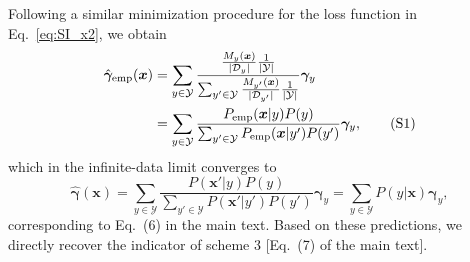 \documentclass[twocolumn,aps,pra,superscriptaddress,tightlines,nofootinbib]{revtex4-2}
\newcommand\numberthis{\addtocounter{equation}{1}\tag{\theequation}}
\begin{document}
	\indent Following a similar minimization procedure for the loss function in Eq.~\eqref{eq:SI_x2}, we obtain
	\begin{align*}
		\hat{\bm{\gamma}}_{\rm emp}(\bm{x}) &= \sum_{y \in \mathcal{Y}} \frac{ \frac{M_{y}(\bm{x})}{|\mathcal{D}_{y}|} \frac{1}{|\mathcal{Y}|}}{\sum_{y' \in \mathcal{Y}} \frac{M_{y'}(\bm{x})}{|\mathcal{D}_{y'}|} \frac{1}{|\mathcal{Y}|}} \bm{\gamma}_{y}\\
		&= \sum_{y \in \mathcal{Y}} \frac{ P_{\rm emp}(\bm{x}|y) P(y)}{\sum_{y' \in \mathcal{Y}} P_{\rm emp}(\bm{x}|y') P(y')} \bm{\gamma}_{y},\numberthis
	\end{align*}
	which in the infinite-data limit converges to 
	\begin{equation}
		\hat{\bm{\gamma}}(\bm{x}) = \sum_{y\in \mathcal{Y}} \frac{P(\bm{x}'|y)P(y)}{\sum_{y'\in \mathcal{Y}} P(\bm{x}'|y')P(y')} \bm{\gamma}_{y} = \sum_{y\in \mathcal{Y}} P(y|\bm{x}) \bm{\gamma}_{y},
	\end{equation}
	corresponding to Eq.~(6) in the main text. Based on these predictions, we directly recover the indicator of scheme 3 [Eq.~(7) of the main text].\\
	
\end{document}
